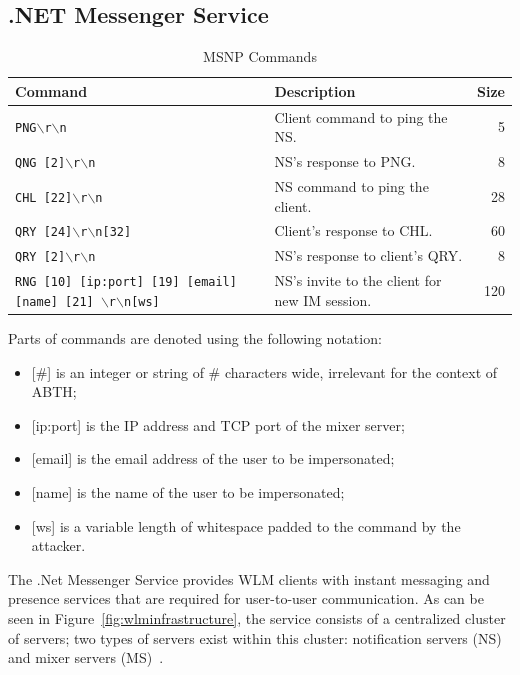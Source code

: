 \documentclass{sig-alternate}
\begin{document}
\subsection{.NET Messenger Service}

\begin{table}[tbp]
	\centering

	\caption {MSNP Commands}
	\label{tab:commandlist}

	\begin{tabular}{llr}
		\hline
		\hline
		\textbf{Command} & \textbf{Description} & \textbf{Size} \\
		\hline
		\texttt{PNG$\backslash$r$\backslash$n} & Client command to ping the NS. & 5 \\
		\texttt{QNG [2]$\backslash$r$\backslash$n} & NS's response to PNG. & 8 \\
		\texttt{CHL [22]$\backslash$r$\backslash$n} & NS command to ping the client. & 28 \\
		\texttt{QRY [24]$\backslash$r$\backslash$n[32]} & Client's response to CHL. & 60 \\
		\texttt{QRY [2]$\backslash$r$\backslash$n} & NS's response to client's QRY. & 8 \\
		\texttt{RNG [10] [ip:port] [19] [email] [name] [21] $\backslash$r$\backslash$n[ws]} & NS's invite to the client for new IM session. & 120 \\
		\hline
	\end{tabular}

	\begin{flushleft}
	Parts of commands are denoted using the following notation:

	\begin{itemize}
		\item {[\#]} is an integer or string of \# characters wide, irrelevant for the context of ABTH;
		\item {[ip:port]} is the IP address and TCP port of the mixer server;
		\item {[email]} is the email address of the user to be impersonated;
		\item {[name]} is the name of the user to be impersonated;
		\item {[ws]} is a variable length of whitespace padded to the command by the attacker.
	\end{itemize}
	\end{flushleft}
\end{table}

The .Net Messenger Service provides WLM clients with instant messaging and presence services that are required for user-to-user communication.
As can be seen in Figure~\ref{fig:wlminfrastructure}, the service consists of a centralized cluster of servers; two types of servers exist within this cluster: notification servers (NS) and mixer servers (MS)~\cite{torre:wlm}.
\end{document}
